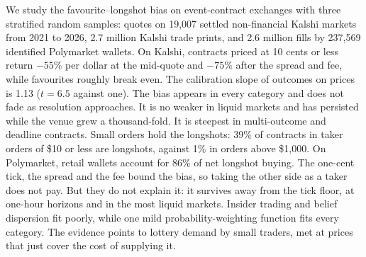 We study the favourite--longshot bias on event-contract exchanges with three stratified random
samples: quotes on 19,007 settled non-financial Kalshi markets from 2021 to 2026, 2.7 million
Kalshi trade prints, and 2.6 million fills by 237,569 identified Polymarket wallets. On Kalshi,
contracts priced at 10 cents or less return $-55\%$ per dollar at the mid-quote and $-75\%$ after
the spread and fee, while favourites roughly break even. The calibration slope of outcomes on prices
is 1.13 ($t=6.5$ against one). The bias appears in every category and does not fade as resolution
approaches. It is no weaker in liquid markets and has persisted while the venue grew a
thousand-fold. It is steepest in multi-outcome and deadline contracts. Small orders hold the
longshots: 39\% of contracts in taker orders of \$10 or less are longshots, against 1\% in orders
above \$1,000. On Polymarket, retail wallets account for 86\% of net longshot buying. The one-cent
tick, the spread and the fee bound the bias, so taking the other side as a taker does not pay. But
they do not explain it: it survives away from the tick floor, at one-hour horizons and in the most
liquid markets. Insider trading and belief dispersion fit poorly, while one mild
probability-weighting function fits every category. The evidence points to lottery demand by
small traders, met at prices that just cover the cost of supplying it.

